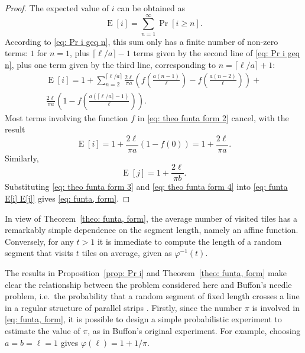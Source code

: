 \documentclass[12pt, a4paper]{article}
\DeclareMathOperator{\E}{E}
\newcommand{\funta}{\varphi} %
\newcommand{\len}{\ell} %
\newcommand{\touches}{visits}
\newcommand{\touched}{visited}
\begin{document}
\begin{proof}
The expected value of $i$ can be obtained as
\begin{equation}
\label{eq: theo funta form 1}
\E[i] = \sum_{n=1}^\infty \Pr[i \geq n].
\end{equation}
According to \eqref{eq: Pr i geq n}, this sum only has a finite number of non-zero terms: $1$ for $n=1$, plus $\lceil \len/a \rceil-1$ terms given by the second line of \eqref{eq: Pr i geq n}, plus one term given by the third line, corresponding to $n = \lceil \len/a \rceil +1 $:
\begin{equation}
\label{eq: theo funta form 2}
\begin{split}
\E[i] = 1 +
\sum_{n=2}^{\lceil \len/a \rceil} \frac{2\len}{\pi a} \left(f\left(\frac{a(n-1)}{\len}\right)-f\left(\frac{a(n-2)}{\len} \right)\right) + \\
\frac{2\len}{\pi a} \left(1-f\left(\frac{a(\lceil \len/a \rceil - 1)}{\len} \right)\right).
\end{split}
\end{equation}
Most terms involving the function $f$ in \eqref{eq: theo funta form 2} cancel, with the result
\begin{equation}
\label{eq: theo funta form 3}
\E[i] = 1+\frac{2\len}{\pi a} (1-f(0))= 1+\frac{2\len}{\pi a}.
\end{equation}
Similarly,
\begin{equation}
\label{eq: theo funta form 4}
\E[j] = 1+\frac{2\len}{\pi b}.
\end{equation}
Substituting \eqref{eq: theo funta form 3} and \eqref{eq: theo funta form 4} into \eqref{eq: funta E[i] E[j]} gives \eqref{eq: funta, form}.
\end{proof}

In view of Theorem~\ref{theo: funta, form}, the average number of \touched{} tiles has a remarkably simple dependence on the segment length, namely an affine function. Conversely, for any $t>1$ it is immediate to compute the length of a random segment that \touches{} $t$ tiles on average, given as $\funta^{-1}(t)$.

The results in Proposition~\ref{prop: Pr i} and Theorem~\ref{theo: funta, form} make clear the relationship between the problem considered here and Buffon's needle problem, i.e.~the probability that a random segment of fixed length crosses a line in a regular structure of parallel strips \cite[section 1.1]{Mathai99}. Firstly, since the number $\pi$ is involved in \eqref{eq: funta, form}, it is possible to design a simple probabilistic experiment to estimate the value of $\pi$, as in Buffon's original experiment. For example, choosing $a=b=\len=1$ gives $\funta(\len) = 1+1/\pi$.
\end{document}
